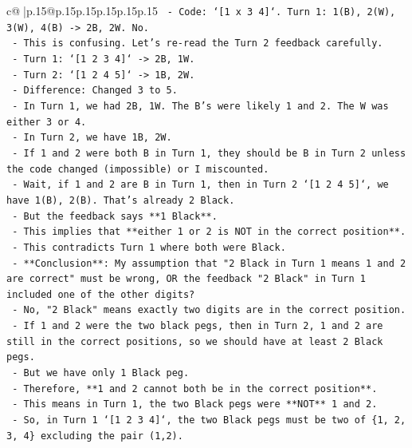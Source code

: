 \documentclass{article}
\begin{document}
{\begin{supertabular}{c@{$\;$}|p{.15\linewidth}@{}p{.15\linewidth}p{.15\linewidth}p{.15\linewidth}p{.15\linewidth}p{.15\linewidth}}
{{{\texttt{                {-} Code: `{[}1 x 3 4{]}`. Turn 1: 1(B), 2(W), 3(W), 4(B) {-}> 2B, 2W. No.} \\
\texttt{            {-} This is confusing. Let's re{-}read the Turn 2 feedback carefully.} \\
\texttt{            {-} Turn 1: `{[}1 2 3 4{]}` {-}> 2B, 1W.} \\
\texttt{            {-} Turn 2: `{[}1 2 4 5{]}` {-}> 1B, 2W.} \\
\texttt{            {-} Difference: Changed 3 to 5.} \\
\texttt{            {-} In Turn 1, we had 2B, 1W. The B's were likely 1 and 2. The W was either 3 or 4.} \\
\texttt{            {-} In Turn 2, we have 1B, 2W.} \\
\texttt{            {-} If 1 and 2 were both B in Turn 1, they should be B in Turn 2 unless the code changed (impossible) or I miscounted.} \\
\texttt{            {-} Wait, if 1 and 2 are B in Turn 1, then in Turn 2 `{[}1 2 4 5{]}`, we have 1(B), 2(B). That's already 2 Black.} \\
\texttt{            {-} But the feedback says **1 Black**.} \\
\texttt{            {-} This implies that **either 1 or 2 is NOT in the correct position**.} \\
\texttt{            {-} This contradicts Turn 1 where both were Black.} \\
\texttt{            {-} **Conclusion**: My assumption that "2 Black in Turn 1 means 1 and 2 are correct" must be wrong, OR the feedback "2 Black" in Turn 1 included one of the other digits?} \\
\texttt{            {-} No, "2 Black" means exactly two digits are in the correct position.} \\
\texttt{            {-} If 1 and 2 were the two black pegs, then in Turn 2, 1 and 2 are still in the correct positions, so we should have at least 2 Black pegs.} \\
\texttt{            {-} But we have only 1 Black peg.} \\
\texttt{            {-} Therefore, **1 and 2 cannot both be in the correct position**.} \\
\texttt{            {-} This means in Turn 1, the two Black pegs were **NOT** 1 and 2.} \\
\texttt{            {-} So, in Turn 1 `{[}1 2 3 4{]}`, the two Black pegs must be two of \{1, 2, 3, 4\} excluding the pair (1,2).} \\
}}}
\end{supertabular}}
\end{document}
